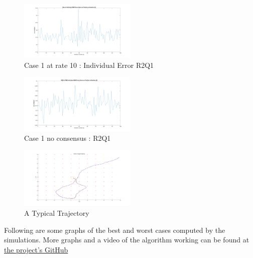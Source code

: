 \documentclass[twocolumn]{article}
\begin{document}
\begin{figure}[h!]
    \centering
    \includegraphics[width=0.50\textwidth]{Immagini/IndvErroC1_10R2Q1.png}
    \caption{Case 1 at rate 10 : Individual Error R2Q1}
    \label{fig:number}
\end{figure}
\begin{figure}[h!]
    \centering
    \includegraphics[width=0.50\textwidth]{Immagini/RMSnoconsC1R2Q1.png}
    \caption{Case 1 no consensus : R2Q1}
    \label{fig:number}
\end{figure}
\begin{figure}[h!]
    \centering
    \includegraphics[width=0.50\textwidth]{Immagini/Trajectory.png}
    \caption{A Typical Trajectory}
    \label{fig:number}
\end{figure}

Following are some graphs of the best and worst cases computed by the simulations. More graphs and a video of the algorithm working can 
be found at \href{https://github.com/PaioPaio/IMM-Sensors-Network/tree/no_speed_jumps/Graphs}{the project's GitHub} 

 

\end{document}
